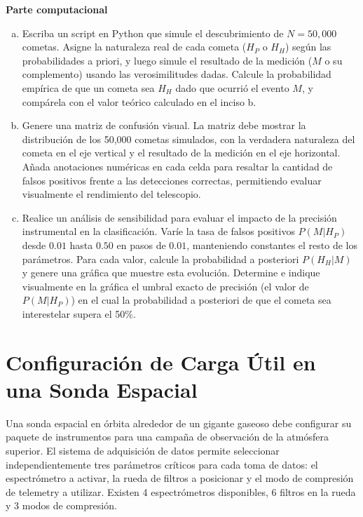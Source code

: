 \documentclass[a4paper]{article}
\begin{document}
\textbf{Parte computacional}
\begin{enumerate}[a)]
\item Escriba un script en Python que simule el descubrimiento de $N = 50,000$ cometas. Asigne la naturaleza real de cada cometa ($H_P$ o $H_H$) según las probabilidades a priori, y luego simule el resultado de la medición ($M$ o su complemento) usando las verosimilitudes dadas. Calcule la probabilidad empírica de que un cometa sea $H_H$ dado que ocurrió el evento $M$, y compárela con el valor teórico calculado en el inciso b.
\item Genere una matriz de confusión visual. La matriz debe mostrar la distribución de los 50,000 cometas simulados, con la verdadera naturaleza del cometa en el eje vertical y el resultado de la medición en el eje horizontal. Añada anotaciones numéricas en cada celda para resaltar la cantidad de falsos positivos frente a las detecciones correctas, permitiendo evaluar visualmente el rendimiento del telescopio.
\item Realice un análisis de sensibilidad para evaluar el impacto de la precisión instrumental en la clasificación. Varíe la tasa de falsos positivos $P(M|H_P)$ desde $0.01$ hasta $0.50$ en pasos de $0.01$, manteniendo constantes el resto de los parámetros. Para cada valor, calcule la probabilidad a posteriori $P(H_H|M)$ y genere una gráfica que muestre esta evolución. Determine e indique visualmente en la gráfica el umbral exacto de precisión (el valor de $P(M|H_P)$) en el cual la probabilidad a posteriori de que el cometa sea interestelar supera el 50\%.
\end{enumerate}

\section{Configuración de Carga Útil en una Sonda Espacial}
\label{sec:problema-24}

Una sonda espacial en órbita alrededor de un gigante gaseoso debe configurar su paquete de instrumentos para una campaña de observación de la atmósfera superior. El sistema de adquisición de datos permite seleccionar independientemente tres parámetros críticos para cada toma de datos: el espectrómetro a activar, la rueda de filtros a posicionar y el modo de compresión de telemetry a utilizar. Existen 4 espectrómetros disponibles, 6 filtros en la rueda y 3 modos de compresión.
\end{document}
